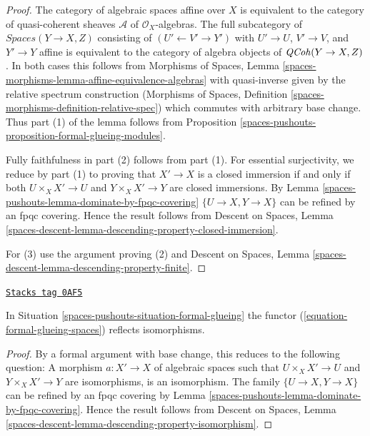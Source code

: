 \begin{proof}
The category of algebraic spaces affine over $X$ is equivalent to the
category of quasi-coherent sheaves $\mathcal{A}$ of $\mathcal{O}_X$-algebras.
The full subcategory of $\textit{Spaces}(Y \to X, Z)$ consisting of
$(U' \leftarrow V' \rightarrow Y')$ with $U' \to U$, $V' \to V$,
and $Y' \to Y$ affine is equivalent to the category of
algebra objects of $\mathit{QCoh}(Y \to X, Z)$. In both cases this follows
from Morphisms of Spaces, Lemma
\ref{spaces-morphisms-lemma-affine-equivalence-algebras}
with quasi-inverse given by the relative spectrum construction
(Morphisms of Spaces, Definition
\ref{spaces-morphisms-definition-relative-spec})
which commutes with arbitrary base change. Thus part (1) of the
lemma follows from Proposition \ref{spaces-pushouts-proposition-formal-glueing-modules}.

\medskip\noindent
Fully faithfulness in part (2) follows from part (1). For essential
surjectivity, we reduce by part (1) to proving that $X' \to X$
is a closed immersion if and only if both $U \times_X X' \to U$ and
$Y \times_X X' \to Y$ are closed immersions. By
Lemma \ref{spaces-pushouts-lemma-dominate-by-fpqc-covering}
$\{U \to X, Y \to X\}$ can be refined by an fpqc covering.
Hence the result follows from
Descent on Spaces, Lemma
\ref{spaces-descent-lemma-descending-property-closed-immersion}.

\medskip\noindent
For (3) use the argument proving (2) and
Descent on Spaces, Lemma
\ref{spaces-descent-lemma-descending-property-finite}.
\end{proof}

\begin{lemma}
\label{spaces-pushouts-lemma-reflects-isomorphisms}
\href{https://stacks.math.columbia.edu/tag/0AF5}{\texttt{Stacks tag 0AF5}}

In Situation \ref{spaces-pushouts-situation-formal-glueing} the functor
(\ref{equation-formal-glueing-spaces}) reflects isomorphisms.
\end{lemma}

\begin{proof}
By a formal argument with base change, this reduces to the following
question: A morphism $a : X' \to X$ of algebraic spaces such that
$U \times_X X' \to U$ and $Y \times_X X' \to Y$ are isomorphisms, is
an isomorphism. The family $\{U \to X, Y \to X\}$ can be refined by
an fpqc covering by Lemma \ref{spaces-pushouts-lemma-dominate-by-fpqc-covering}.
Hence the result follows from
Descent on Spaces, Lemma
\ref{spaces-descent-lemma-descending-property-isomorphism}.
\end{proof}

